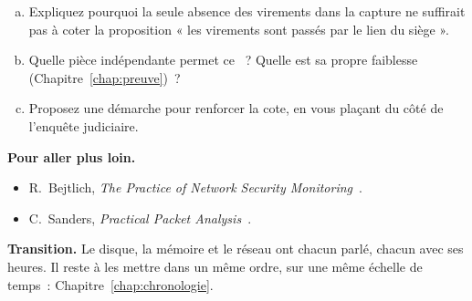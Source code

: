 \begin{boxexo}[title={\ding{45}\quad Exercice~6.4. Le NON des virements \niveauexpert}]
\begin{enumerate}[(a)]
    \item Expliquez pourquoi la seule absence des virements dans la capture
          ne suffirait pas à coter \NON{} la proposition « les virements
          sont passés par le lien du siège ».
    \item Quelle pièce indépendante permet ce \NON{}~? Quelle est sa propre
          faiblesse (Chapitre~\ref{chap:preuve})~?
    \item Proposez une démarche pour renforcer la cote, en vous plaçant du
          côté de l'enquête judiciaire.
\end{enumerate}
\end{boxexo}

\bigskip

\begin{boxinfo}
\textbf{Pour aller plus loin.}
\begin{itemize}
    \item R.~Bejtlich, \textit{The Practice of Network Security
          Monitoring}~\cite{bejtlich2013nsm}.
    \item C.~Sanders, \textit{Practical Packet Analysis}~\cite{sanders2017packet}.
\end{itemize}
\end{boxinfo}

\begin{boxinfo}
\textbf{Transition.} Le disque, la mémoire et le réseau ont chacun parlé,
chacun avec ses heures. Il reste à les mettre dans un même ordre, sur une
même échelle de temps~: Chapitre~\ref{chap:chronologie}.
\end{boxinfo}
